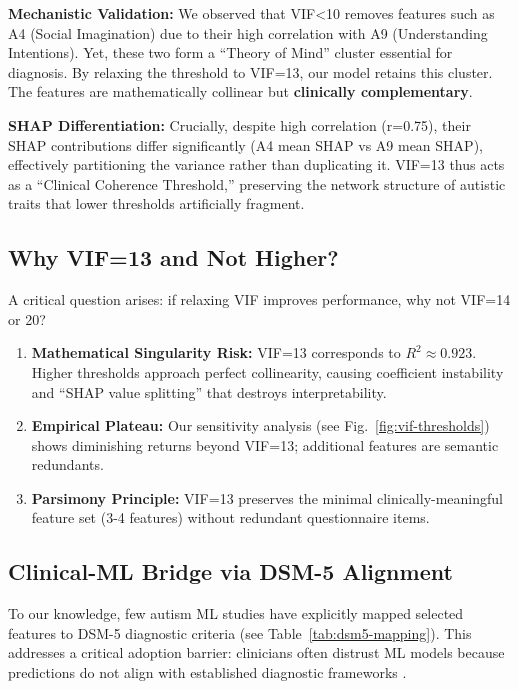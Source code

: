 \documentclass[pdflatex,sn-vancouver-num]{sn-jnl}
\begin{document}
\textbf{Mechanistic Validation:} We observed that VIF\textless10 removes features such as A4 (Social Imagination) due to their high correlation with A9 (Understanding Intentions). Yet, these two form a ``Theory of Mind'' cluster essential for diagnosis. By relaxing the threshold to VIF=13, our model retains this cluster. The features are mathematically collinear but \textbf{clinically complementary}.

\textbf{SHAP Differentiation:} Crucially, despite high correlation (r=0.75), their SHAP contributions differ significantly (A4 mean \textbar SHAP vs A9 mean \textbar SHAP), effectively partitioning the variance rather than duplicating it. VIF=13 thus acts as a ``Clinical Coherence Threshold,'' preserving the network structure of autistic traits that lower thresholds artificially fragment.

\subsection{Why VIF=13 and Not Higher?}\label{why-vif13-and-not-higher}

A critical question arises: if relaxing VIF improves performance, why not VIF=14 or 20?

\begin{enumerate}
\def\labelenumi{\arabic{enumi}.}
\item
  \textbf{Mathematical Singularity Risk:} VIF=13 corresponds to $R^2 \approx 0.923$. Higher thresholds approach perfect collinearity, causing coefficient instability and ``SHAP value splitting'' that destroys interpretability.
\item
  \textbf{Empirical Plateau:} Our sensitivity analysis (see Fig.~\ref{fig:vif-thresholds}) shows diminishing returns beyond VIF=13; additional features are semantic redundants.
\item
  \textbf{Parsimony Principle:} VIF=13 preserves the minimal clinically-meaningful feature set (3-4 features) without redundant questionnaire items.
\end{enumerate}

\subsection{Clinical-ML Bridge via DSM-5 Alignment}\label{clinical-ml-bridge-via-dsm-5-alignment}

To our knowledge, few autism ML studies have explicitly mapped selected features to DSM-5 diagnostic criteria (see Table~\ref{tab:dsm5-mapping}). This addresses a critical adoption barrier: clinicians often distrust ML models because predictions do not align with established diagnostic frameworks \cite{ref16}.
\end{document}

